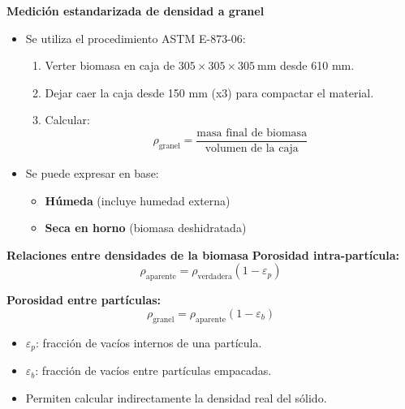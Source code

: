 \documentclass[../../main.tex]{subfiles}
\begin{document}
\begin{frame}{\textbf{Medición estandarizada de densidad a granel}}
\begin{itemize}
  \item Se utiliza el procedimiento ASTM E-873-06:
  \begin{enumerate}
    \item Verter biomasa en caja de \(305 \times 305 \times 305\ \text{mm}\) desde 610 mm.
    \item Dejar caer la caja desde 150 mm (x3) para compactar el material.
    \item Calcular:
\[
    \rho_{\text{granel}} = \frac{\text{masa final de biomasa}}{\text{volumen de la caja}}
 \]
  \end{enumerate}
  \item Se puede expresar en base:
  \begin{itemize}
    \item \textbf{Húmeda} (incluye humedad externa)
    \item \textbf{Seca en horno} (biomasa deshidratada)
  \end{itemize}
\end{itemize}
\end{frame}

\begin{frame}{\textbf{Relaciones entre densidades de la biomasa}}
\textbf{Porosidad intra-partícula:}
\[
\rho_{\text{aparente}} = \rho_{\text{verdadera}} (1 - \varepsilon_p)
\]

\textbf{Porosidad entre partículas:}
\[
\rho_{\text{granel}} = \rho_{\text{aparente}} (1 - \varepsilon_b) 
\]

\vspace{1em}
\begin{itemize}
  \item \( \varepsilon_p \): fracción de vacíos internos de una partícula.
  \item \( \varepsilon_b \): fracción de vacíos entre partículas empacadas.
  \item Permiten calcular indirectamente la densidad real del sólido.
\end{itemize}
\end{frame}
\end{document}
